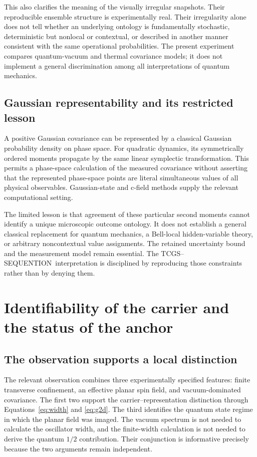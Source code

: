 \documentclass[11pt,a4paper]{article}
\theoremstyle{definition}
\theoremstyle{remark}
\newcommand{\TCGS}{TCGS--SEQUENTION}
\begin{document}
This also clarifies the meaning of the visually irregular snapshots. Their reproducible ensemble structure is experimentally real. Their irregularity alone does not tell whether an underlying ontology is fundamentally stochastic, deterministic but nonlocal or contextual, or described in another manner consistent with the same operational probabilities. The present experiment compares quantum-vacuum and thermal covariance models; it does not implement a general discrimination among all interpretations of quantum mechanics.\cite{zhang2026}

\subsection{Gaussian representability and its restricted lesson}
A positive Gaussian covariance can be represented by a classical Gaussian probability density on phase space. For quadratic dynamics, its symmetrically ordered moments propagate by the same linear symplectic transformation. This permits a phase-space calculation of the measured covariance without asserting that the represented phase-space points are literal simultaneous values of all physical observables. Gaussian-state and c-field methods supply the relevant computational setting.\cite{weedbrook,blakie}

The limited lesson is that agreement of these particular second moments cannot identify a unique microscopic outcome ontology. It does not establish a general classical replacement for quantum mechanics, a Bell-local hidden-variable theory, or arbitrary noncontextual value assignments. The retained uncertainty bound and the measurement model remain essential. The \TCGS\ interpretation is disciplined by reproducing those constraints rather than by denying them.\cite{born,foundation}

\section{Identifiability of the carrier and the status of the anchor}
\label{sec:anchor}
\subsection{The observation supports a local distinction}
The relevant observation combines three experimentally specified features: finite transverse confinement, an effective planar spin field, and vacuum-dominated covariance. The first two support the carrier--representation distinction through Equations~\eqref{eq:width} and \eqref{eq:g2d}. The third identifies the quantum state regime in which the planar field was imaged. The vacuum spectrum is not needed to calculate the oscillator width, and the finite-width calculation is not needed to derive the quantum $1/2$ contribution. Their conjunction is informative precisely because the two arguments remain independent.\cite{zhang2026}
\end{document}
